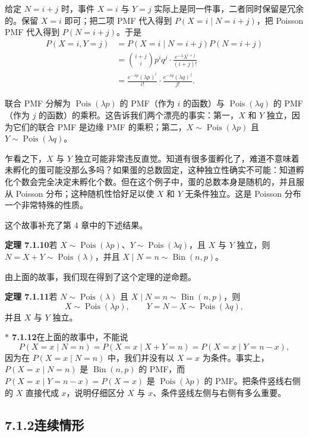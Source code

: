 \documentclass[UTF8,12pt,a4paper,fontset=fandol]{ctexart}
\newcommand{\biohazard}{\ensuremath{\ast}}
\begin{document}
给定 $N=i+j$ 时，事件 $X=i$ 与 $Y=j$ 实际上是同一件事，二者同时保留是冗余的。保留 $X=i$ 即可；把二项 PMF 代入得到 $P(X=i\mid N=i+j)$，把 Poisson PMF 代入得到 $P(N=i+j)$。于是
\[
\begin{aligned}
  P(X=i,Y=j)
  &=P(X=i\mid N=i+j)P(N=i+j)\\
  &=\binom{i+j}{i}p^i q^j\cdot \frac{e^{-\lambda}\lambda^{i+j}}{(i+j)!}\\
  &=\frac{e^{-\lambda p}(\lambda p)^i}{i!}\cdot
    \frac{e^{-\lambda q}(\lambda q)^j}{j!}.
\end{aligned}
\]

联合 PMF 分解为 $\operatorname{Pois}(\lambda p)$ 的 PMF（作为 $i$ 的函数）与 $\operatorname{Pois}(\lambda q)$ 的 PMF（作为 $j$ 的函数）的乘积。这告诉我们两个漂亮的事实：第一，$X$ 和 $Y$ 独立，因为它们的联合 PMF 是边缘 PMF 的乘积；第二，$X\sim \operatorname{Pois}(\lambda p)$ 且 $Y\sim \operatorname{Pois}(\lambda q)$。

乍看之下，$X$ 与 $Y$ 独立可能非常违反直觉。知道有很多蛋孵化了，难道不意味着未孵化的蛋可能没那么多吗？如果蛋的总数固定，这种独立性确实不可能：知道孵化个数会完全决定未孵化个数。但在这个例子中，蛋的总数本身是随机的，并且服从 Poisson 分布；这种随机性恰好足以使 $X$ 和 $Y$ 无条件独立。这是 Poisson 分布一个非常特殊的性质。

这个故事补充了第 4 章中的下述结果。

\noindent\textbf{定理 7.1.10}\quad 若 $X\sim \operatorname{Pois}(\lambda p)$、$Y\sim \operatorname{Pois}(\lambda q)$，且 $X$ 与 $Y$ 独立，则 $N=X+Y\sim \operatorname{Pois}(\lambda)$，并且 $X\mid N=n\sim \operatorname{Bin}(n,p)$。

由上面的故事，我们现在得到了这个定理的逆命题。

\noindent\textbf{定理 7.1.11}\quad 若 $N\sim \operatorname{Pois}(\lambda)$ 且 $X\mid N=n\sim \operatorname{Bin}(n,p)$，则
\[
  X\sim \operatorname{Pois}(\lambda p),\qquad
  Y=N-X\sim \operatorname{Pois}(\lambda q),
\]
并且 $X$ 与 $Y$ 独立。

\noindent\textbf{$\biohazard$ 7.1.12}\quad 在上面的故事中，不能说
\[
  P(X=x\mid N=n)=P(X=x\mid X+Y=n)=P(X=x\mid Y=n-x),
\]
因为在 $P(X=x\mid N=n)$ 中，我们并没有以 $X=x$ 为条件。事实上，$P(X=x\mid N=n)$ 是 $\operatorname{Bin}(n,p)$ 的 PMF，而 $P(X=x\mid Y=n-x)=P(X=x)$ 是 $\operatorname{Pois}(\lambda p)$ 的 PMF。把条件竖线右侧的 $X$ 直接代成 $x$，说明仔细区分 $X$ 与 $x$、条件竖线左侧与右侧有多么重要。

\subsection*{7.1.2\quad 连续情形}
\end{document}

